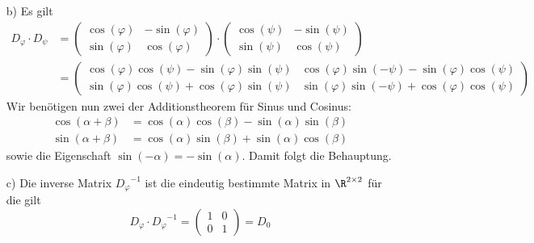 \begin{itemize}
\begin{itemize}
\end{itemize}
\item[b)]
Es gilt
\begin{align*}
D_\varphi \cdot D_\psi&=\begin{pmatrix}
		\cos(\varphi)	&-\sin(\varphi)	\\
		\sin(\varphi)	&\cos(\varphi)
	\end{pmatrix}\cdot\begin{pmatrix}
		\cos(\psi)	&-\sin(\psi)	\\
		\sin(\psi)	&\cos(\psi)
	\end{pmatrix}\\
	&= \begin{pmatrix}\cos(\varphi)\cos(\psi)-\sin(\varphi)\sin(\psi) &\cos(\varphi)\sin(-\psi)-\sin(\varphi)\cos(\psi) \\\sin(\varphi)\cos(\psi)+\cos(\varphi)\sin(\psi) &\sin(\varphi)\sin(-\psi)+\cos(\varphi)\cos(\psi)\end{pmatrix}
\end{align*}
Wir benötigen nun zwei der Additionstheorem für Sinus und Cosinus:
\begin{align*}
\cos(\alpha+\beta)&=\cos(\alpha)\cos(\beta)-\sin(\alpha)\sin(\beta)\\
\sin(\alpha+\beta)&=\cos(\alpha)\sin(\beta)+\sin(\alpha)\cos(\beta)
\end{align*}
sowie die Eigenschaft $\sin(-\alpha)=-\sin(\alpha)$. Damit folgt die Behauptung.
\item[c)] 
Die inverse Matrix ${D_\varphi}^{-1}$ ist die eindeutig bestimmte Matrix in $\R^{2\times2}$ für die gilt 
$$D_\varphi\cdot {D_\varphi}^{-1}=\begin{pmatrix} 1 & 0 \\ 0 & 1 \end{pmatrix}=D_0$$

\end{itemize}
